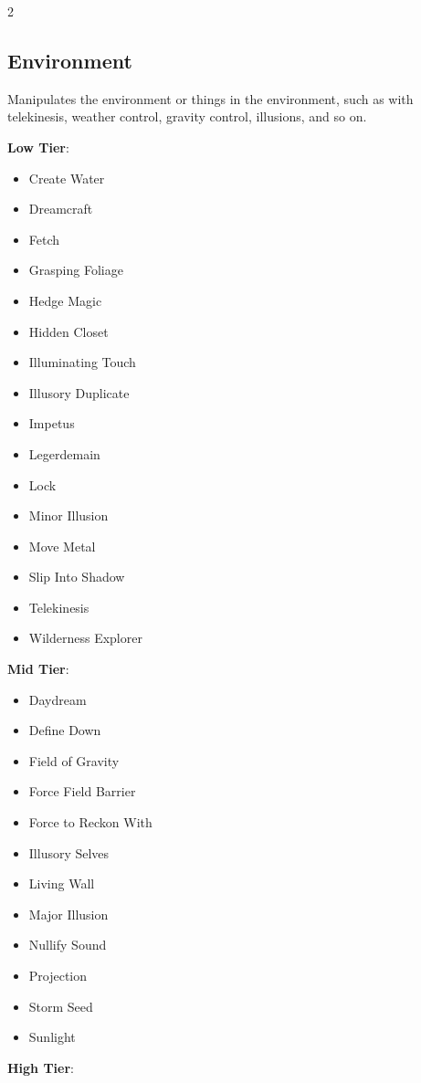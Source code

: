 \begin{multicols}{2}
\subsection{Environment}

Manipulates the environment or things in the environment, such as with telekinesis, weather control, gravity control, illusions, and so on.

\textbf{Low Tier}:

\begin{itemize}
\item Create Water
\item Dreamcraft
\item Fetch
\item Grasping Foliage
\item Hedge Magic
\item Hidden Closet
\item Illuminating Touch
\item Illusory Duplicate
\item Impetus
\item Legerdemain
\item Lock
\item Minor Illusion
\item Move Metal
\item Slip Into Shadow
\item Telekinesis
\item Wilderness Explorer
\end{itemize}

\textbf{Mid Tier}:

\begin{itemize}
\item Daydream
\item Define Down
\item Field of Gravity
\item Force Field Barrier
\item Force to Reckon With
\item Illusory Selves
\item Living Wall
\item Major Illusion
\item Nullify Sound
\item Projection
\item Storm Seed
\item Sunlight
\end{itemize}

\textbf{High Tier}:


\end{multicols}
